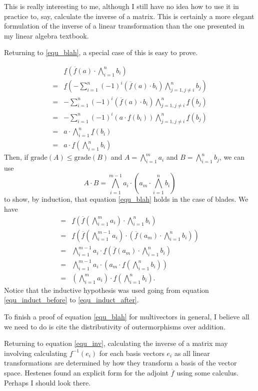 \documentclass[12pt]{article}
\newcommand{\uf}{\underline{f}}
\newcommand{\of}{\overline{f}}
\newcommand{\grade}{\mbox{grade}}
\begin{document}
This is really interesting to me, although I still have no idea how to use it in practice to, say, calculate
the inverse of a matrix.  This is certainly a more elegant formulation of the inverse of a linear transformation
than the one presented in my linear algebra textbook.

Returning to \eqref{equ_blah}, a special case of this is easy to prove.

\begin{align}
 & \uf\left(\of(a)\cdot\bigwedge_{i=1}^n b_i\right) \\
=& \uf\left(-\sum_{i=1}^n(-1)^i (\of(a)\cdot b_i)\bigwedge_{j=1,j\neq i}^n b_j\right) \\
=& -\sum_{i=1}^n(-1)^i (\of(a)\cdot b_i)\bigwedge_{j=1,j\neq i}^n \uf(b_j) \\
=& -\sum_{i=1}^n(-1)^i (a\cdot\uf(b_i))\bigwedge_{j=1,j\neq i}^n \uf(b_j) \\
=& a\cdot\bigwedge_{i=1}^n\uf(b_i) \\
=& a\cdot \uf\left(\bigwedge_{i=1}^n b_i\right)
\end{align}
Then, if $\grade(A)\leq\grade(B)$ and $A=\bigwedge_{i=1}^m a_i$ and $B=\bigwedge_{i=1}^n b_j$, we can use
\begin{equation}
A\cdot B = \bigwedge_{i=1}^{m-1} a_i\cdot\left(a_m\cdot \bigwedge_{i=1}^n b_i\right)
\end{equation}
to show, by induction, that equation \eqref{equ_blah} holds in the case of blades.  We have
\begin{align}
 =& \uf\left(\of\left(\bigwedge_{i=1}^m a_i\right)\cdot\bigwedge_{i=1}^n b_i\right) \\
 =& \uf\left(\of\left(\bigwedge_{i=1}^{m-1} a_i\right)\cdot\left(\of(a_m)\cdot\bigwedge_{i=1}^n b_i\right)\right)\label{equ_induct_before} \\
 =& \bigwedge_{i=1}^{m-1} a_i\cdot\uf\left(\of(a_m)\cdot\bigwedge_{i=1}^n b_i\right)\label{equ_induct_after} \\
 =& \bigwedge_{i=1}^{m-1} a_i\cdot\left(a_m\cdot\uf\left(\bigwedge_{i=1}^n b_i\right)\right) \\
 =& \left(\bigwedge_{i=1}^m a_i\right)\cdot\uf\left(\bigwedge_{i=1}^n b_i\right).
\end{align}
Notice that the inductive hypothesis was used going from equation \eqref{equ_induct_before} to \eqref{equ_induct_after}.

To finish a proof of equation \eqref{equ_blah} for multivectors in general, I believe all we need to do is cite the distributivity of outermorphisms
over addition.

Returning to equation \eqref{equ_inv}, calculating the inverse of a matrix may involving
calculating $\uf^{-1}(e_i)$ for each basis vectors $e_i$ as all linear transformations are
determined by how they transform a basis of the vector space.  Hestenes found an explicit
form for the adjoint $\of$ using some calculus.  Perhaps I should look there.
\end{document}
